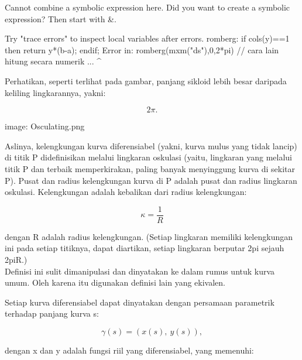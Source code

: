 \documentclass[a4paper,10pt]{article}
\begin{document}
\begin{eulernotebook}
\begin{eulercomment}
\begin{eulercomment}
\begin{eulercomment}
\begin{eulercomment}
\begin{eulercomment}
\begin{eulercomment}
\begin{eulercomment}
\begin{eulercomment}
\begin{euleroutput}
  Cannot combine a symbolic expression here.
  Did you want to create a symbolic expression?
  Then start with &.
  
  Try "trace errors" to inspect local variables after errors.
  romberg:
      if cols(y)==1 then return y*(b-a); endif;
  Error in:
  romberg(mxm("ds"),0,2*pi) // cara lain hitung secara numerik ...
                           ^
\end{euleroutput}
\begin{eulercomment}
Perhatikan, seperti terlihat pada gambar, panjang sikloid lebih besar daripada keliling lingkarannya, yakni:

\end{eulercomment}
\begin{eulerformula}
\[
2\pi.
\]
\end{eulerformula}
\begin{eulercomment}
image: Osculating.png

Aslinya, kelengkungan kurva diferensiabel (yakni, kurva mulus yang
tidak lancip) di titik P didefinisikan melalui lingkaran oskulasi
(yaitu, lingkaran yang melalui titik P dan terbaik memperkirakan,
paling banyak menyinggung kurva di sekitar P). Pusat dan radius
kelengkungan kurva di P adalah pusat dan radius lingkaran oskulasi.
Kelengkungan adalah kebalikan dari radius kelengkungan:

\end{eulercomment}
\begin{eulerformula}
\[
\kappa =\frac {1}{R}
\]
\end{eulerformula}
\begin{eulercomment}
dengan R adalah radius kelengkungan. (Setiap lingkaran memiliki
kelengkungan ini pada setiap titiknya, dapat diartikan, setiap
lingkaran berputar 2pi sejauh 2piR.)\\
Definisi ini sulit dimanipulasi dan dinyatakan ke dalam rumus untuk
kurva umum. Oleh karena itu digunakan definisi lain yang ekivalen.

\end{eulercomment}
\begin{eulercomment}
Setiap kurva diferensiabel dapat dinyatakan dengan persamaan
parametrik terhadap panjang kurva s:

\end{eulercomment}
\begin{eulerformula}
\[
\gamma(s) = (x(s),\ y(s)),
\]
\end{eulerformula}
\begin{eulercomment}
dengan x dan y adalah fungsi riil yang diferensiabel, yang memenuhi:


\end{eulercomment}
\end{eulercomment}
\end{eulercomment}
\end{eulercomment}
\end{eulercomment}
\end{eulercomment}
\end{eulercomment}
\end{eulercomment}
\end{eulercomment}
\end{eulernotebook}
\end{document}

